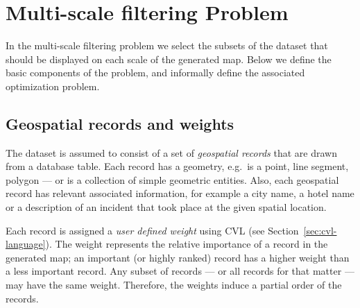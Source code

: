 \section{Multi-scale filtering Problem}
\label{sec:background}


In the multi-scale filtering problem we select the subsets of the dataset that should be displayed on each scale of the generated map. Below we define the basic components of the problem, and informally define the associated optimization problem. 

\subsection{Geospatial records and weights}
\label{sec:records}


The dataset is assumed to consist of a set of \emph{geospatial records} that are drawn from a database table. Each record has a geometry, e.g.\ is a point, line segment, polygon --- or is a collection of simple geometric entities. Also, each geospatial record has relevant associated information, for example a city name, a hotel name or a description of an incident that took place at the given spatial location.

Each record is assigned a \emph{user defined weight} using CVL (see Section~\ref{sec:cvl-language}). The weight represents the relative importance of a record in the generated map; an important (or highly ranked) record has a higher weight than a less important record. Any subset of records --- or all records for that matter --- may have the same weight. Therefore, the weights induce a partial order of the records.



